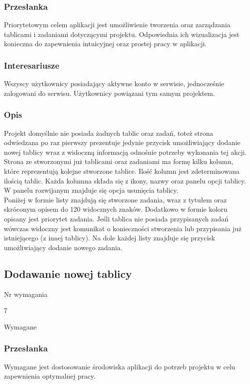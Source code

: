\documentclass[eng,printmode]{mgr}
\begin{document}
\subsubsection{Przesłanka}
Priorytetowym celem aplikacji jest umożliwienie tworzenia oraz zarządzania tablicami i zadaniami dotyczącymi projektu. Odpowiednia ich wizualizacja jest konieczna do zapewnienia intuicyjnej oraz prostej pracy w aplikacji.

\subsubsection{Interesariusze}
Wszyscy użytkownicy posiadający aktywne konto w serwisie, jednocześnie zalogowani do serwisu. Użytkownicy powiązani tym samym projektem.

\subsubsection{Opis}
Projekt domyślnie nie posiada żadnych tablic oraz zadań, toteż strona odwiedzana po raz pierwszy prezentuje jedynie przycisk umożliwiający dodanie nowej tablicy wraz z widoczną informacją odnośnie potrzeby wykonania tej akcji. \\
Strona ze stworzonymi już tablicami oraz zadaniami ma formę kilku kolumn, które reprezentują kolejne stworzone tablice. Ilość kolumn jest zdeterminowana ilością tablic. Każda kolumna składa się z ikony, nazwy oraz panelu opcji tablicy. W panelu rozwijanym znajduje się opcja usunięcia tablicy. \\
Poniżej w formie listy znajdują się stworzone zadania, wraz z tytułem oraz skróconym opisem do 120 widocznych znaków. Dodatkowo w formie koloru opisany jest priorytet zadania. Jeśli tablica nie posiada przypisanych zadań wówczas widoczny jest komunikat o konieczności stworzenia lub przypisania już istniejącego (z innej tablicy). Na dole każdej listy znajduje się przycisk umożliwiający dodanie nowego zadania.

\subsection{Dodawanie nowej tablicy}
\begin{labeling}{Nr wymagania}
\item [Nr wymagania:] 7
\item [Priorytet:] Wymagane
\end{labeling}

\subsubsection{Przesłanka}
Wymagane jest dostosowanie środowiska aplikacji do potrzeb projektu w celu zapewnienia optymalnej pracy.
\end{document}
